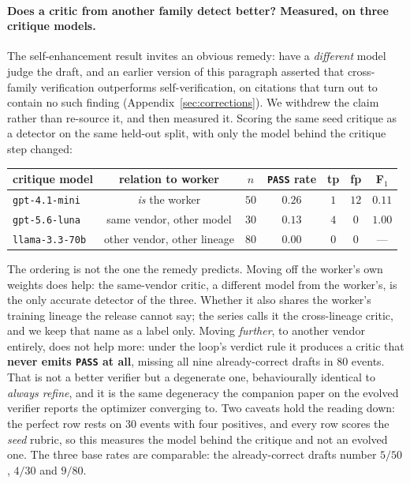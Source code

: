 \documentclass[11pt]{article}
\begin{document}
\paragraph{Does a critic from another family detect better? Measured, on three critique models.}
The self-enhancement result invites an obvious remedy: have a \emph{different} model judge the
draft, and an earlier version of this paragraph asserted that cross-family verification
outperforms self-verification, on citations that turn out to contain no such finding
(Appendix~\ref{sec:corrections}). We withdrew the claim rather than re-source it, and then
measured it. Scoring the same seed critique as a detector on the same held-out split, with only
the model behind the critique step changed:

\begin{center}\small
\begin{tabular}{lcccccc}
\toprule
critique model & relation to worker & $n$ & \texttt{PASS} rate & tp & fp & F$_1$ \\
\midrule
\texttt{gpt-4.1-mini} & \emph{is} the worker & $50$ & $0.26$ & $1$ & $12$ & $0.11$ \\
\texttt{gpt-5.6-luna} & same vendor, other model & $30$ & $0.13$ & $4$ & $0$ & $\mathbf{1.00}$ \\
\texttt{llama-3.3-70b} & other vendor, other lineage & $80$ & $\mathbf{0.00}$ & $0$ & $0$ & --- \\
\bottomrule
\end{tabular}
\end{center}

\noindent
The ordering is not the one the remedy predicts. Moving off the worker's own weights does help:
the same-vendor critic, a different model from the worker's, is the only accurate detector of
the three. Whether it also shares the worker's training lineage the release cannot say; the series
calls it the cross-lineage critic, and we keep that name as a label only. Moving
\emph{further}, to another vendor entirely, does not help more: under the loop's verdict rule it
produces a critic that \textbf{never emits \texttt{PASS} at all}, missing all nine
already-correct drafts in $80$ events.
That is not a better verifier but a degenerate one, behaviourally identical to \emph{always
refine}, and it is the same degeneracy the companion paper on the evolved verifier reports the
optimizer converging to. Two caveats hold the reading down: the perfect row rests on $30$ events
with four positives, and every row scores the \emph{seed} rubric, so this measures the model
behind the critique and not an evolved one. The three base rates are comparable: the
already-correct drafts number $5/50$, $4/30$ and $9/80$.
\end{document}
